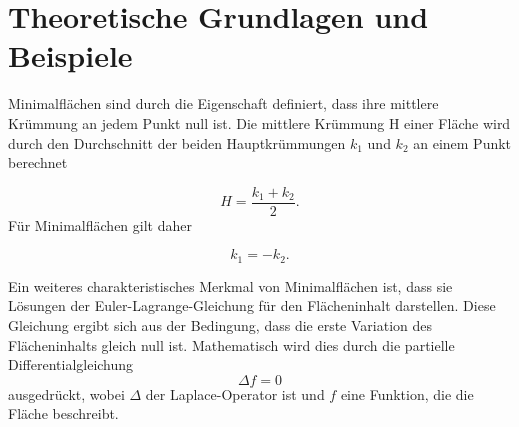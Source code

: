 %
%
%
%
\section{Theoretische Grundlagen und Beispiele
	\label{minimalflaechen:section:Theoretische Grundlagen und Beispiele}}
Minimalflächen sind durch die Eigenschaft definiert, dass ihre mittlere Krümmung an jedem Punkt null ist.
Die mittlere Krümmung H einer Fläche wird durch den Durchschnitt der beiden Hauptkrümmungen $k_1$ und $k_2$ an einem Punkt berechnet

\begin{equation}
	H=\frac{k_{1}+k_{2}}{2}.
\end{equation}
%
Für Minimalflächen gilt daher

\begin{equation}
	k_{1}=-k_{2}.
\end{equation}

Ein weiteres charakteristisches Merkmal von Minimalflächen ist, dass sie Lösungen der Euler-Lagrange-Gleichung für den Flächeninhalt darstellen.
Diese Gleichung ergibt sich aus der Bedingung, dass die erste Variation des Flächeninhalts gleich null ist.
Mathematisch wird dies durch die partielle Differentialgleichung
%
\begin{equation}
	\Delta f = 0
\end{equation}
%
ausgedrückt, wobei $\Delta$ der Laplace-Operator ist und $f$ eine Funktion, die die Fläche beschreibt.

